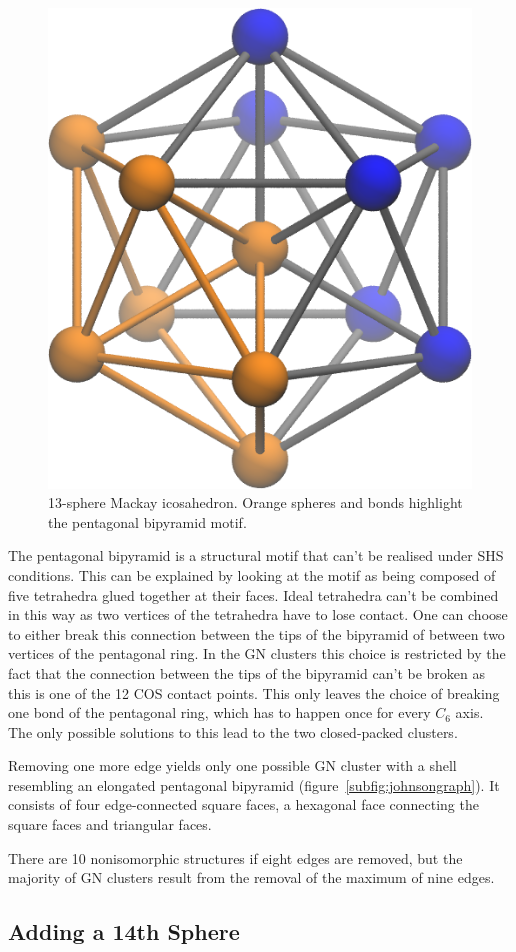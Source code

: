 \begin{figure}
    \centering
    \includegraphics[width=.4\textwidth]{gregory-newton/icopent.png}
    \caption{13-sphere Mackay icosahedron. Orange spheres and bonds highlight
    the pentagonal bipyramid motif.}
    \label{fig:icopent}
\end{figure}

The pentagonal bipyramid is a structural motif that can't be realised under
\ac{SHS} conditions. This can be explained by looking at the motif as being
composed of five tetrahedra glued together at their faces. Ideal tetrahedra
can't be combined in this way as two vertices of the tetrahedra have to lose
contact.\autocite{Hayes_ScienceStickySpheres_2012} One can choose to either
break this connection between the tips of the bipyramid of between two vertices
of the pentagonal ring. In the \ac{GN} clusters this choice is restricted by
the fact that the connection between the tips of the bipyramid can't be broken
as this is one of the 12 \ac{COS} contact points.  This only leaves the choice
of breaking one bond of the pentagonal ring, which has to happen once for every
$C_6$ axis. The only possible solutions to this lead to the two closed-packed
clusters.

Removing one more edge yields only one possible \ac{GN} cluster with a shell
resembling an elongated pentagonal bipyramid
(figure~\ref{subfig:johnsongraph}). It consists of four edge-connected square
faces, a hexagonal face connecting the square faces and triangular faces.

There are 10 nonisomorphic structures if eight edges are removed, but the
majority of \ac{GN} clusters result from the removal of the maximum of nine
edges.


\subsection{Adding a 14th Sphere}
\label{sec:addinga14thsphere}

